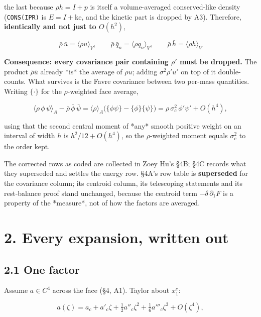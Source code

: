 \documentclass[11pt,a4paper]{article}
\begin{document}
the last because $\rho h=I+p$ is itself a volume-averaged conserved-like density
(\texttt{CONS(IPR)} is $E=I+\mathrm{ke}$, and the kinetic part is dropped by A3).
Therefore, \textbf{identically and not just to $O(h^2)$},

\begin{equation*}
\boxed{\;\bar\rho\,\bar u=\langle\rho u\rangle_V,\qquad
\bar\rho\,\bar q_n=\langle\rho q_n\rangle_V,\qquad
\bar\rho\,\bar h=\langle\rho h\rangle_V\;}
\tag{1A.2}
\end{equation*}

\textbf{Consequence: every covariance pair containing $\rho'$ must be dropped.} The
product $\bar\rho\bar u$ already *is* the average of $\rho u$; adding
$\sigma^2\rho'u'$ on top of it double-counts. What survives is the Favre
covariance between two per-mass quantities. Writing $\{\cdot\}$ for the
$\rho$-weighted face average,

\begin{equation*}
\langle\rho\,\phi\,\psi\rangle_A-\bar\rho\,\bar\phi\,\bar\psi
=\langle\rho\rangle_A\big(\{\phi\psi\}-\{\phi\}\{\psi\}\big)
=\rho\,\sigma_c^2\,\phi'\psi' + O(h^4),
\tag{1A.3}
\end{equation*}

using that the second central moment of *any* smooth positive weight on an
interval of width $h$ is $h^2/12+O(h^4)$, so the $\rho$-weighted moment equals
$\sigma_c^2$ to the order kept.

The corrected rows as coded are collected in Zoey Hu's §4B; §4C records what they superseded and settles the energy row. §4A's row table is \textbf{superseded} for
the covariance column; its centroid column, its telescoping statements and its
rest-balance proof stand unchanged, because the centroid term $-\delta\,\partial_1F$
is a property of the *measure*, not of how the factors are averaged.

\hrulefill

\section*{2. Every expansion, written out}

\subsection*{2.1 One factor}

Assume $a\in C^4$ across the face (§4, A1). Taylor about $x_1^c$:

\begin{equation*}
a(\zeta) = a_c + a'_c\zeta + \tfrac12 a''_c\zeta^2
+ \tfrac16 a'''_c\zeta^3 + O(\zeta^4),
\end{equation*}
\end{document}
